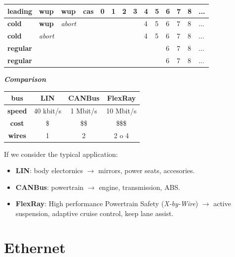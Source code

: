 \begin{tabular}{ | p{1.5cm} | p{1cm} | p{1cm} | p{1cm} | p{0.5cm} | p{0.5cm} | p{0.5cm} | p{0.5cm} | p{0.5cm} | p{0.5cm} | p{0.5cm} | p{0.5cm} | p{0.5cm} | p{0.5cm} | } \hline
    \textbf{leading} & \textbf{wup} & \textbf{wup} & \textbf{cas} & 0 & 1 & 2 & 3 & 4 & 5 & 6 & 7 & 8 & ... \\ \hline
    \textbf{cold} & \textbf{wup} & \textit{abort} & & & & & & 4 & 5 & 6 & 7 & 8 & ...\\ \hline
    \textbf{cold} & \textit{abort} & & & & & & & 4 & 5 & 6 & 7 & 8 & ... \\ \hline
    \textbf{regular} & & & & & & & & & & 6 & 7 & 8 & ... \\ \hline
    \textbf{regular} & & & & & & & & & & 6 & 7 & 8 & ... \\ \hline
\end{tabular}

\textbf{\textit{Comparison}} 
\begin{center}
    \begin{tabular}{ | c | c | c | c | } \hline
        \textbf{bus} & LIN & CANBus & FlexRay \\ \hline
        \textbf{speed} & 40 kbit/s & 1 Mbit/s & 10 Mbit/s \\ \hline
        \textbf{cost} & \$ & \$\$ & \$\$\$ \\ \hline
        \textbf{wires} & 1 & 2 & 2 o 4 \\ \hline
    \end{tabular}
\end{center}
If we consider the typical application:
\begin{itemize}[nosep]
    \item \textbf{LIN}: body electornics $\rightarrow$ mirrors, power seats, accesories.
    \item \textbf{CANBus}: powertrain $\rightarrow$ engine, transmission, ABS.
    \item \textbf{FlexRay}: High performance Powertrain Safety (\textit{X-by-Wire}) $\rightarrow$ active suspension, adaptive cruise control, keep lane assist.
\end{itemize}

\newpage
\section{Ethernet}

